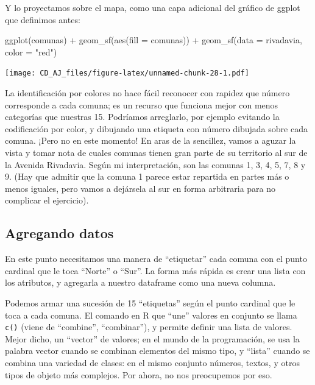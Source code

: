 \documentclass[
]{book}
\newenvironment{Shaded}{\begin{snugshade}}{\end{snugshade}}
\newcommand{\AttributeTok}[1]{\textcolor[rgb]{0.77,0.63,0.00}{#1}}
\newcommand{\FunctionTok}[1]{\textcolor[rgb]{0.00,0.00,0.00}{#1}}
\newcommand{\NormalTok}[1]{#1}
\newcommand{\SpecialCharTok}[1]{\textcolor[rgb]{0.00,0.00,0.00}{#1}}
\newcommand{\StringTok}[1]{\textcolor[rgb]{0.31,0.60,0.02}{#1}}
\begin{document}
Y lo proyectamos sobre el mapa, como una capa adicional del gráfico de ggplot que definimos antes:

\begin{Shaded}
\begin{Highlighting}[]
\FunctionTok{ggplot}\NormalTok{(comunas) }\SpecialCharTok{+}
    \FunctionTok{geom\_sf}\NormalTok{(}\FunctionTok{aes}\NormalTok{(}\AttributeTok{fill =}\NormalTok{ comunas)) }\SpecialCharTok{+}
    \FunctionTok{geom\_sf}\NormalTok{(}\AttributeTok{data =}\NormalTok{ rivadavia, }\AttributeTok{color =} \StringTok{"red"}\NormalTok{)}
\end{Highlighting}
\end{Shaded}

\texttt{[image: CD\_AJ\_files/figure-latex/unnamed-chunk-28-1.pdf]}

La identificación por colores no hace fácil reconocer con rapidez que número corresponde a cada comuna; es un recurso que funciona mejor con menos categorías que nuestras 15. Podríamos arreglarlo, por ejemplo evitando la codificación por color, y dibujando una etiqueta con número dibujada sobre cada comuna. ¡Pero no en este momento! En aras de la sencillez, vamos a aguzar la vista y tomar nota de cuales comunas tienen gran parte de su territorio al sur de la Avenida Rivadavia. Según mi interpretación, son las comunas 1, 3, 4, 5, 7, 8 y 9. (Hay que admitir que la comuna 1 parece estar repartida en partes más o menos iguales, pero vamos a dejársela al sur en forma arbitraria para no complicar el ejercicio).

\hypertarget{agregando-datos}{%
\subsection{Agregando datos}\label{agregando-datos}}

En este punto necesitamos una manera de ``etiquetar'' cada comuna con el punto cardinal que le toca ``Norte'' o ``Sur''. La forma más rápida es crear una lista con los atributos, y agregarla a nuestro dataframe como una nueva columna.

Podemos armar una sucesión de 15 ``etiquetas'' según el punto cardinal que le toca a cada comuna. El comando en R que ``une'' valores en conjunto se llama \texttt{c()} (viene de ``combine'', ``combinar''), y permite definir una lista de valores. Mejor dicho, un ``vector'' de valores; en el mundo de la programación, se usa la palabra vector cuando se combinan elementos del mismo tipo, y ``lista'' cuando se combina una variedad de clases: en el mismo conjunto números, textos, y otros tipos de objeto más complejos. Por ahora, no nos preocupemos por eso.
\end{document}
